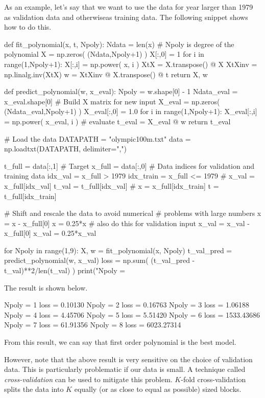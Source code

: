 As an example, let's say that we want to use the data for year larger
than 1979 as validation data and otherwiseas training data. The following
snippet shows how to do this.
\begin{pythoncode}
def fit_polynomial(x, t, Npoly):
    Ndata = len(x)
    # Npoly is degree of the polynomial
    X = np.zeros( (Ndata,Npoly+1) )
    X[:,0] = 1
    for i in range(1,Npoly+1):
        X[:,i] = np.power( x, i )
    XtX = X.transpose() @ X
    XtXinv = np.linalg.inv(XtX)
    w = XtXinv @ X.transpose() @ t
    return X, w
  
def predict_polynomial(w, x_eval):
    Npoly = w.shape[0] - 1
    Ndata_eval = x_eval.shape[0]
    # Build X matrix for new input
    X_eval = np.zeros( (Ndata_eval,Npoly+1) )
    X_eval[:,0] = 1.0
    for i in range(1,Npoly+1):
        X_eval[:,i] = np.power( x_eval, i )
    # evaluate
    t_eval = X_eval @ w
    return t_eval
  
# Load the data
DATAPATH = "olympic100m.txt"
data = np.loadtxt(DATAPATH, delimiter=",")
  
t_full = data[:,1] # Target
x_full = data[:,0]
# Data indices for validation and training data
idx_val = x_full > 1979
idx_train = x_full <= 1979
#
x_val = x_full[idx_val]
t_val = t_full[idx_val]
#
x = x_full[idx_train]
t = t_full[idx_train]
  
# Shift and rescale the data to avoid numerical
# problems with large numbers
x = x - x_full[0]
x = 0.25*x
# also do this for validation input
x_val = x_val - x_full[0]
x_val = 0.25*x_val
  
for Npoly in range(1,9):
    X, w = fit_polynomial(x, Npoly)
    t_val_pred = predict_polynomial(w, x_val)
    loss = np.sum( (t_val_pred - t_val)**2/len(t_val) )
    print("Npoly = %
\end{pythoncode}

The result is shown below.
\begin{textcode}
Npoly =  1   loss =    0.10130
Npoly =  2   loss =    0.16763
Npoly =  3   loss =    1.06188
Npoly =  4   loss =    4.45706
Npoly =  5   loss =    5.51420
Npoly =  6   loss = 1533.43686
Npoly =  7   loss =   61.91356
Npoly =  8   loss = 6023.27314
\end{textcode}
From this result, we can say that first order polynomial is the best model.

However, note that the above result is very sensitive on the choice of validation data.
This is particularly problematic if our data is small.
A technique called \emph{cross-validation} can be used to mitigate this problem.
$K$-fold cross-validation splits the data into $K$ equally (or as close to equal as
possible) sized blocks.

